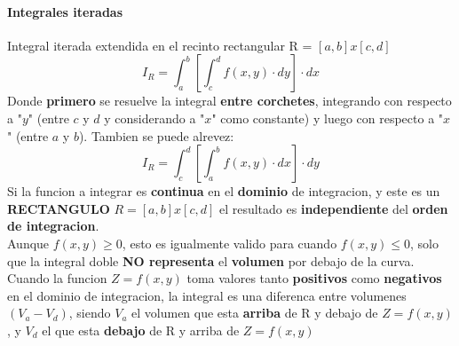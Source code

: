 \documentclass[11pt]{article}
\begin{document}
\paragraph{Integrales iteradas}
Integral iterada extendida en el recinto rectangular R = $[a, b]x[c, d]$
\begin{equation*}
	I_R = \int_{a}^{b} \left[\int_{c}^{d} f(x, y)\cdot dy \right] \cdot dx
\end{equation*}
Donde \textbf{primero} se resuelve la integral \textbf{entre corchetes}, integrando con respecto a "$y$" (entre $c$ y $d$ y considerando a "$x$" como constante) y luego con respecto a "$x$" (entre $a$ y $b$). Tambien se puede alrevez:
\begin{equation*}
	I_R = \int_{c}^{d} \left[\int_{a}^{b} f(x, y)\cdot dx \right] \cdot dy
\end{equation*}
Si la funcion a integrar es \textbf{continua} en el \textbf{dominio} de integracion, y este es un \textbf{RECTANGULO} $R = [a, b]x[c, d]$ el resultado es \textbf{independiente} del \textbf{orden de integracion}.\\
\linebreak
Aunque $f(x, y) \geq 0$, esto es igualmente valido para cuando $f(x, y) \leq 0$, solo que la integral doble \textbf{NO representa} el \textbf{volumen} por debajo de la curva.\\
\linebreak
Cuando la funcion $Z = f(x, y)$ toma valores tanto \textbf{positivos} como \textbf{negativos} en el dominio de integracion, la integral es una diferenca entre volumenes $(V_a - V_d)$, siendo $V_a$ el volumen que esta \textbf{arriba} de R y debajo de $Z = f(x, y)$, y $V_d$ el que esta \textbf{debajo} de R y arriba de $Z = f(x, y)$
\end{document}

